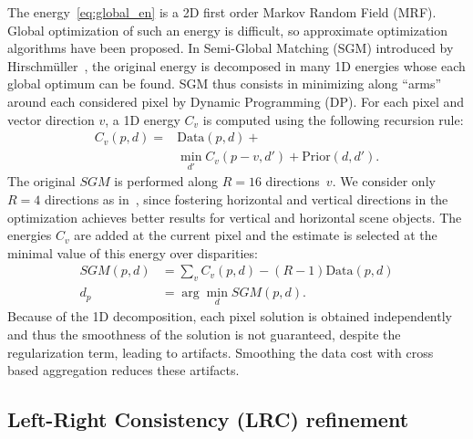 \documentclass{article}
\begin{document}
The energy~\eqref{eq:global_en} is a 2D first order Markov Random Field (MRF). Global optimization of such an energy is difficult, so approximate optimization algorithms have been proposed. In Semi-Global Matching (SGM) introduced by Hirschm\"uller~\cite{hirschmuller08}, the original energy is decomposed in many 1D energies whose each global optimum can be found. SGM thus consists in minimizing along ``arms'' around each considered pixel by Dynamic Programming (DP). For each pixel and vector direction $v$, a 1D energy $C_v$ is computed using the following recursion rule:
\begin{equation}
\begin{split}
C_v(p,d) = & \text{Data}(p,d) + \\
& \min_{d'}{ C_v(p-v,d') + \text{Prior}(d,d')}.
\end{split}
\end{equation}
The original $SGM$ is performed along $R=16$ directions~$v$. We consider only $R=4$ directions as in~\cite{zbontar16}, since fostering horizontal and vertical directions in the optimization achieves better results for vertical and horizontal scene objects. The energies $C_v$ are added at the current pixel and the estimate is selected at the minimal value of this energy over disparities:
\begin{equation}
\begin{split}
SGM(p,d) & = \sum_{v} C_v(p,d) - (R-1)\text{Data}(p,d) \\
d_p & = \arg\min_{d}{SGM(p,d)}.
\end{split}
\end{equation}
Because of the 1D decomposition, each pixel solution is obtained independently and thus the smoothness of the solution is not guaranteed, despite the regularization term, leading to artifacts. Smoothing the data cost with cross based aggregation reduces these artifacts.

\subsection{Left-Right Consistency (LRC) refinement}
\label{ss:lr_cons}
\end{document}

